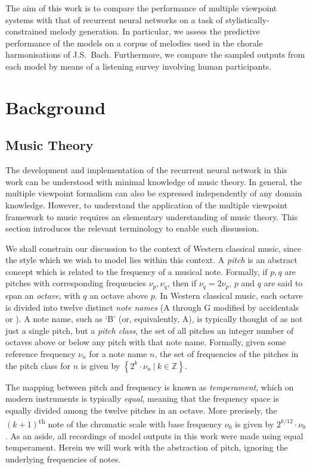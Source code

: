 \documentclass[12pt,a4paper,twoside,openright]{report}
\newcommand{\set}[1]{ \left\{ #1 \right\} }
\newcommand{\insharp}[0]{\sharp[raise=0.1,scale=0.8]}
\newcommand{\inflat}[0]{\flat[raise=0.1,scale=0.8]}
\begin{document}
The aim of this work is to compare the performance of multiple viewpoint systems
with that of recurrent neural networks on a task of stylistically-constrained
melody generation. In particular, we assess the predictive performance of the
models on a corpus of melodies used in the chorale harmonisations of J.S.\ Bach.
Furthermore, we compare the sampled outputs from each model by means of a
listening survey involving human participants.

\section{Background}

\subsection{Music Theory}

The development and implementation of the recurrent neural network in this work
can be understood with minimal knowledge of music theory. In general, the
multiple viewpoint formalism can also be expressed independently of any domain
knowledge.  However, to understand the application of the multiple viewpoint
framework to music requires an elementary understanding of music theory.  This
section introduces the relevant terminology to enable such dissussion.

We shall constrain our discussion to the context of Western classical music,
since the style which we wish to model lies within this context. A \emph{pitch}
is an abstract concept which is related to the frequency of a musical note.
Formally, if $p,q$ are pitches with corresponding frequencies $\nu_p,\nu_q$,
then if $\nu_q = 2\nu_p$, $p$ and $q$ are said to span an \emph{octave}, with
$q$ an octave above $p$. In Western classical music, each octave is divided into
twelve distinct \emph{note names} (A through G modified by accidentals
\insharp{} or \inflat{}). A note name, such as `B\inflat' (or, equivalently,
A\insharp), is typically thought of as not just a single pitch, but a
\emph{pitch class}, the set of all pitches an integer number of octaves above or
below any pitch with that note name.  Formally, given some reference frequency
$\nu_n$ for a note name $n$, the set of frequencies of the pitches in the pitch
class for $n$ is given by $\set{ 2^k \cdot \nu_n\ |\ k \in \mathbb{Z} }.$

The mapping between pitch and frequency is known as \emph{temperament}, which on
modern instruments is typically \emph{equal}, meaning that the frequency space is
equally divided among the twelve pitches in an octave. More precisely, the
$(k+1)$\textsuperscript{th} note of the chromatic scale with base frequency $\nu_0$ is
given by $2^{k/12}\cdot\nu_0$. As an aside, all recordings of
model outputs in this work were made using equal temperament. Herein
we will work with the abstraction of pitch, ignoring the underlying frequencies
of notes.
\end{document}
